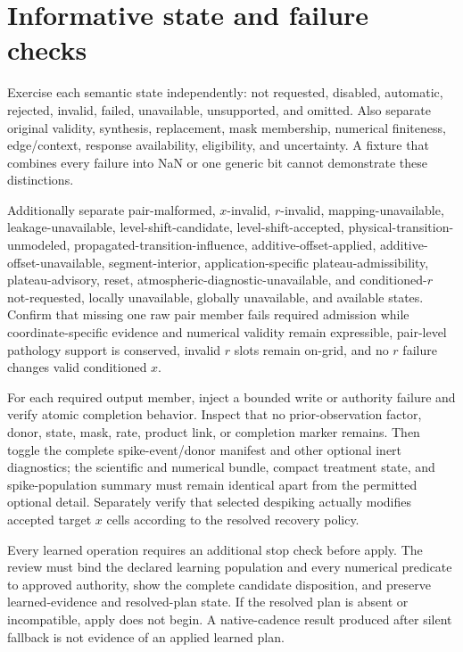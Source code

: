 \documentclass[10pt]{article}
\begin{document}
\section{Informative state and failure checks}
\label{sec:eng-failure}

Exercise each semantic state independently: not requested, disabled,
automatic, rejected, invalid, failed, unavailable, unsupported, and omitted.
Also separate original validity, synthesis, replacement, mask membership,
numerical finiteness, edge/context, response availability, eligibility, and
uncertainty.  A fixture that combines every failure into NaN or one generic
bit cannot demonstrate these distinctions.

Additionally separate pair-malformed, $x$-invalid, $r$-invalid,
mapping-unavailable, leakage-unavailable, level-shift-candidate,
level-shift-accepted, physical-transition-unmodeled,
propagated-transition-influence, additive-offset-applied,
additive-offset-unavailable, segment-interior, application-specific
plateau-admissibility, plateau-advisory, reset, atmospheric-diagnostic-unavailable,
and conditioned-$r$ not-requested, locally unavailable, globally unavailable,
and available states.  Confirm that missing one raw pair member fails required
admission while coordinate-specific evidence and numerical validity remain
expressible, pair-level pathology support is conserved, invalid $r$ slots
remain on-grid, and no $r$ failure changes valid conditioned $x$.

For each required output member, inject a bounded write or authority failure
and verify atomic completion behavior.  Inspect that no prior-observation
factor, donor, state, mask, rate, product link, or completion marker remains.
Then toggle the complete spike-event/donor manifest and other optional inert
diagnostics; the scientific and numerical bundle, compact treatment state, and
spike-population summary must remain identical apart from the permitted
optional detail.  Separately verify that selected despiking actually modifies
accepted target $x$ cells according to the resolved recovery policy.

Every learned operation requires an additional stop check before apply.  The
review must bind the declared learning population and every numerical
predicate to approved authority, show the complete candidate disposition, and
preserve learned-evidence and resolved-plan state.
If the resolved plan is absent or incompatible, apply does not begin.  A
native-cadence result produced after silent fallback is not evidence of an
applied learned plan.
\end{document}
